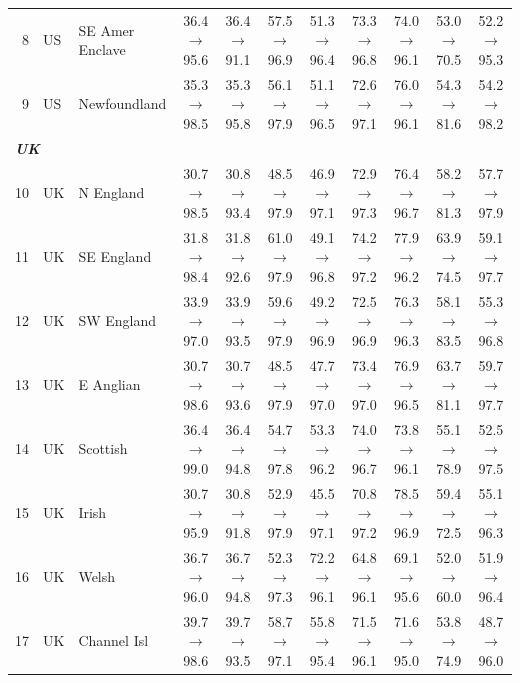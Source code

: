 \begin{table}[t]
{\begin{tabular}{rll c c c c c c c c}
8 & US & SE Amer Enclave & 36.4$\rightarrow$95.6 & 36.4$\rightarrow$91.1 & 57.5$\rightarrow$96.9 & 51.3$\rightarrow$96.4 & 73.3$\rightarrow$96.8 & 74.0$\rightarrow$96.1 & 53.0$\rightarrow$70.5 & 52.2$\rightarrow$95.3 \\
9 & US & Newfoundland & 35.3$\rightarrow$98.5 & 35.3$\rightarrow$95.8 & 56.1$\rightarrow$97.9 & 51.1$\rightarrow$96.5 & 72.6$\rightarrow$97.1 & 76.0$\rightarrow$96.1 & 54.3$\rightarrow$81.6 & 54.2$\rightarrow$98.2 \\
\midrule
\multicolumn{11}{l}{\textit{\textbf{UK}}} \\
10 & UK & N England & 30.7$\rightarrow$98.5 & 30.8$\rightarrow$93.4 & 48.5$\rightarrow$97.9 & 46.9$\rightarrow$97.1 & 72.9$\rightarrow$97.3 & 76.4$\rightarrow$96.7 & 58.2$\rightarrow$81.3 & 57.7$\rightarrow$97.9 \\
11 & UK & SE England & 31.8$\rightarrow$98.4 & 31.8$\rightarrow$92.6 & 61.0$\rightarrow$97.9 & 49.1$\rightarrow$96.8 & 74.2$\rightarrow$97.2 & 77.9$\rightarrow$96.2 & 63.9$\rightarrow$74.5 & 59.1$\rightarrow$97.7 \\
12 & UK & SW England & 33.9$\rightarrow$97.0 & 33.9$\rightarrow$93.5 & 59.6$\rightarrow$97.9 & 49.2$\rightarrow$96.9 & 72.5$\rightarrow$96.9 & 76.3$\rightarrow$96.3 & 58.1$\rightarrow$83.5 & 55.3$\rightarrow$96.8 \\
13 & UK & E Anglian & 30.7$\rightarrow$98.6 & 30.7$\rightarrow$93.6 & 48.5$\rightarrow$97.9 & 47.7$\rightarrow$97.0 & 73.4$\rightarrow$97.0 & 76.9$\rightarrow$96.5 & 63.7$\rightarrow$81.1 & 59.7$\rightarrow$97.7 \\
14 & UK & Scottish & 36.4$\rightarrow$99.0 & 36.4$\rightarrow$94.8 & 54.7$\rightarrow$97.8 & 53.3$\rightarrow$96.2 & 74.0$\rightarrow$96.7 & 73.8$\rightarrow$96.1 & 55.1$\rightarrow$78.9 & 52.5$\rightarrow$97.5 \\
15 & UK & Irish & 30.7$\rightarrow$95.9 & 30.8$\rightarrow$91.8 & 52.9$\rightarrow$97.9 & 45.5$\rightarrow$97.1 & 70.8$\rightarrow$97.2 & 78.5$\rightarrow$96.9 & 59.4$\rightarrow$72.5 & 55.1$\rightarrow$96.3 \\
16 & UK & Welsh & 36.7$\rightarrow$96.0 & 36.7$\rightarrow$94.8 & 52.3$\rightarrow$97.3 & 72.2$\rightarrow$96.1 & 64.8$\rightarrow$96.1 & 69.1$\rightarrow$95.6 & 52.0$\rightarrow$60.0 & 51.9$\rightarrow$96.4 \\
17 & UK & Channel Isl & 39.7$\rightarrow$98.6 & 39.7$\rightarrow$93.5 & 58.7$\rightarrow$97.1 & 55.8$\rightarrow$95.4 & 71.5$\rightarrow$96.1 & 71.6$\rightarrow$95.0 & 53.8$\rightarrow$74.9 & 48.7$\rightarrow$96.0 \\

\end{tabular}}
\end{table}
